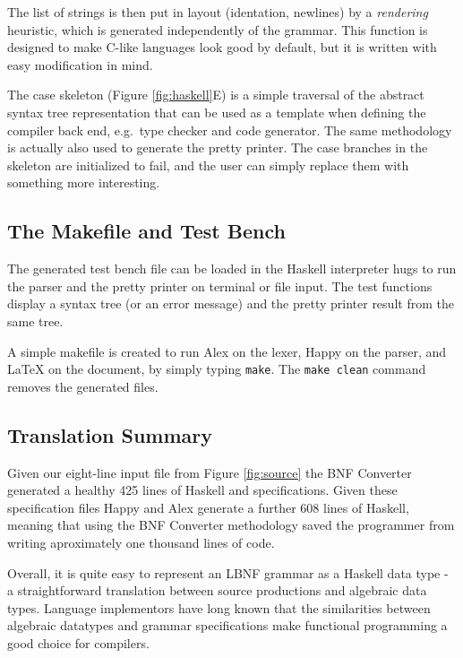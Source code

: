 The list of strings is then put in layout (identation, newlines) by a \textit{rendering}
heuristic, which is generated independently of the grammar. This function is designed to make C-like languages look good by default, but it is written with easy modification in mind.

The case skeleton (Figure \ref{fig:haskell}E) is a simple traversal of the abstract syntax tree representation that can be used as a template when defining the compiler
back end, e.g.\ type checker and code generator. The same methodology is
actually also used to generate the pretty printer. The case branches in the skeleton
are initialized to fail, and the user can simply replace them with something more interesting.

\subsection{The Makefile and Test Bench}

The generated test bench file can be loaded in the Haskell interpreter hugs to
run the parser and the pretty printer on terminal or file input.
The test functions display a syntax tree (or an error message)
and the pretty printer result from the same tree.

A simple makefile is created to run Alex on the lexer, Happy on the parser, and
LaTeX on the document, by simply typing {\tt make}. The {\tt make clean}
command removes the generated files.

\subsection{Translation Summary}

Given our eight-line input file from Figure \ref{fig:source} the BNF Converter generated a healthy 425 lines of Haskell and specifications. Given these specification files Happy and Alex generate a further 608 lines of Haskell, meaning that using the BNF Converter methodology saved the programmer from writing aproximately one thousand lines of code. 

Overall, it is quite easy to represent an LBNF grammar as a Haskell data
type - a straightforward translation between source productions and algebraic data types. Language implementors have long known that the similarities between algebraic datatypes and grammar specifications make functional programming a good choice for compilers.


